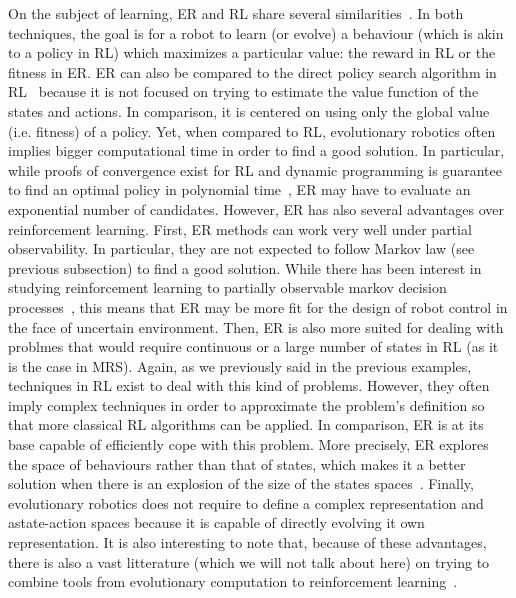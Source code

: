     On the subject of learning, ER and RL share several similarities~\parencite{Whiteson2012, Doncieux2015a}. In both techniques, the goal is for a robot to learn (or evolve) a behaviour (which is akin to a policy in RL) which maximizes a particular value: the reward in RL or the fitness in ER. ER can also be compared to the direct policy search algorithm in RL~\parencite{Kober2013} because it is not focused on trying to estimate the value function of the states and actions. In comparison, it is centered on using only the global value (i.e. fitness) of a policy. Yet, when compared to RL, evolutionary robotics often implies bigger computational time in order to find a good solution. In particular, while proofs of convergence exist for RL and dynamic programming is guarantee to find an optimal policy in polynomial time~\parencite{Littman1994, Whiteson2012}, ER may have to evaluate an exponential number of candidates. However, ER has also several advantages over reinforcement learning. First, ER methods can work very well under partial observability. In particular, they are not expected to follow Markov law (see previous subsection) to find a good solution. While there has been interest in studying reinforcement learning to partially observable markov decision processes~\parencite{Jaakkola1994}, this means that ER may be more fit for the design of robot control in the face of uncertain environment. Then, ER is also more suited for dealing with problmes that would require continuous or a large number of states in RL (as it is the case in MRS). Again, as we previously said in the previous examples, techniques in RL exist to deal with this kind of problems. However, they often imply complex techniques in order to approximate the problem's definition so that more classical RL algorithms can be applied. In comparison, ER is at its base capable of efficiently cope with this problem. More precisely, ER explores the space of behaviours rather than that of states, which makes it a better solution when there is an explosion of the size of the states spaces~\parencite{Panait2005}. Finally, evolutionary robotics does not require to define a complex representation and astate-action spaces because it is capable of directly evolving it own representation. It is also interesting to note that, because of these advantages, there is also a vast litterature (which we will not talk about here) on trying to combine tools from evolutionary computation to reinforcement learning~\parencite{Whiteson2012}.

